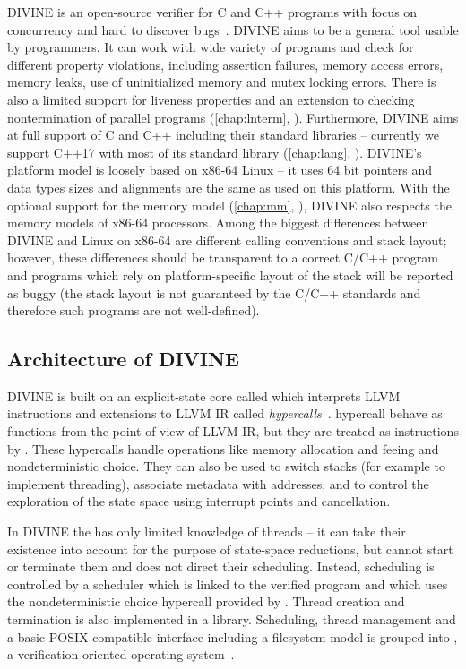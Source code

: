 DIVINE is an open-source verifier for C and C++ programs with focus on
concurrency and hard to discover bugs~.
DIVINE aims to be a general tool usable by programmers.
It can work with wide variety of programs and check for different property
violations, including assertion failures, memory access errors, memory leaks,
use of uninitialized memory and mutex locking errors.
There is also a limited support for liveness properties and an extension to
checking nontermination of parallel programs (\autoref{chap:lnterm},
).
Furthermore, DIVINE aims at full support of C and C++ including their standard
libraries -- currently we support C++17 with most of its standard library
(\autoref{chap:lang}, ).
DIVINE's platform model is loosely based on x86-64 Linux -- it uses 64
bit pointers and data types sizes and alignments are the same as used on this
platform.
With the optional support for the \xtso memory model (\autoref{chap:mm},
), DIVINE also respects the memory models of x86-64
processors.
Among the biggest differences between DIVINE and Linux on x86-64 are different calling conventions and stack layout; however, these differences should be transparent to a correct C/C++ program and programs which rely on platform-specific layout of the stack will be reported as buggy (the stack layout is not guaranteed by the C/C++ standards and therefore such programs are not well-defined).

\subsection{Architecture of DIVINE}

DIVINE is built on an explicit-state core called \divm which interprets LLVM
instructions and \divm extensions to LLVM IR called
\emph{hypercalls}~.
\divm hypercall behave as functions from the point of view of LLVM IR, but they
are treated as instructions by \divm.
These hypercalls handle operations like memory allocation and feeing and
nondeterministic choice.
They can also be used to switch stacks (for example to implement threading),
associate metadata with addresses, and to control the exploration of the state
space using interrupt points and cancellation.

In DIVINE the \divm has only limited knowledge of threads -- it can take their
existence into account for the purpose of state-space reductions, but cannot
start or terminate them and does not direct their scheduling.
Instead, scheduling is controlled by a scheduler which is linked to the
verified program and which uses the nondeterministic choice hypercall provided
by \divm.
Thread creation and termination is also implemented in a library.
Scheduling, thread management and a basic POSIX-compatible interface including
a filesystem model is grouped into \dios, a verification-oriented operating
system~.

